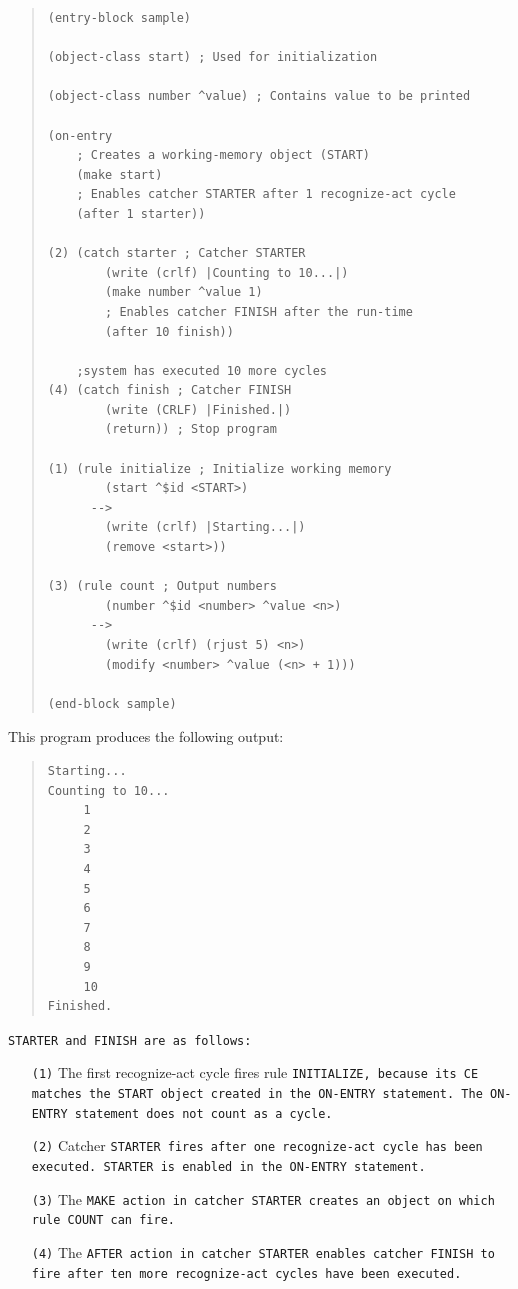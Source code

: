 \begin{quote}
\begin{verbatim}
(entry-block sample)

(object-class start) ; Used for initialization

(object-class number ^value) ; Contains value to be printed

(on-entry
    ; Creates a working-memory object (START)
    (make start)
    ; Enables catcher STARTER after 1 recognize-act cycle
    (after 1 starter))

(2) (catch starter ; Catcher STARTER
        (write (crlf) |Counting to 10...|)
        (make number ^value 1)
        ; Enables catcher FINISH after the run-time
        (after 10 finish))

    ;system has executed 10 more cycles
(4) (catch finish ; Catcher FINISH
        (write (CRLF) |Finished.|)
        (return)) ; Stop program

(1) (rule initialize ; Initialize working memory
        (start ^$id <START>)
      -->
        (write (crlf) |Starting...|)
        (remove <start>))

(3) (rule count ; Output numbers
        (number ^$id <number> ^value <n>)
      -->
        (write (crlf) (rjust 5) <n>)
        (modify <number> ^value (<n> + 1)))

(end-block sample)
\end{verbatim}
\end{quote}

This program produces the following output:

\begin{quote}
\begin{verbatim}
Starting...
Counting to 10...
     1
     2
     3
     4
     5
     6
     7
     8
     9
     10
Finished.
\end{verbatim}
\end{quote}

\tt{STARTER} and \tt{FINISH} are as follows:
\begin{itemize}
\item[\tt{(1)}] The first recognize-act cycle fires rule
  \tt{INITIALIZE}, because its CE matches the \tt{START} object
  created in the \tt{ON-ENTRY} statement. The \tt{ON-ENTRY} statement
  does not count as a cycle.

\item[\tt{(2)}] Catcher \tt{STARTER} fires after one recognize-act
  cycle has been executed. \tt{STARTER} is enabled in the
  \tt{ON-ENTRY} statement.

\item[\tt{(3)}] The \tt{MAKE} action in catcher \tt{STARTER} creates
  an object on which rule \tt{COUNT} can fire.

\item[\tt{(4)}] The \tt{AFTER} action in catcher \tt{STARTER} enables
  catcher \tt{FINISH} to fire after ten more recognize-act cycles have
  been executed.
\end{itemize}

